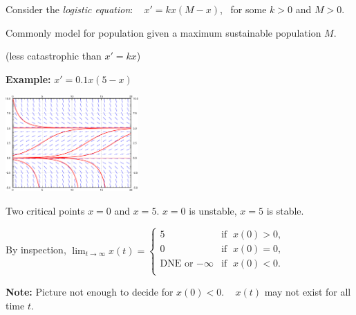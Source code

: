 \documentclass[10pt,aspectratio=169]{beamer}
\begin{document}
\begin{frame}

Consider the \emph{logistic equation}:
~
$x'= kx(M-x)$,~
for some $k > 0$ and $M > 0$.

\medskip
\pause

Commonly model for population given a maximum sustainable population $M$.

(less catastrophic than $x'=kx$)

\medskip
\pause

\textbf{Example:} $x' = 0.1 x(5-x)$

\vspace*{-\baselineskip}

\hspace*{2in} \includegraphics[width=2in]{../figures/2-2-logistic}

\medskip
\pause

Two critical points $x=0$ and $x=5$.
\qquad
\pause
$x=0$ is unstable, \pause $x=5$ is stable.

\medskip
\pause

By inspection, \qquad
$\displaystyle
\lim_{t\to \infty} x(t) = 
\begin{cases}
5 & \text{if } \; x(0) > 0 , \\
0 & \text{if } \; x(0) = 0 , \\
\text{DNE or } {-\infty} & \text{if } \; x(0) < 0 . \\
\end{cases}
$

\medskip
\pause

\textbf{Note:} Picture not enough to decide for $x(0) < 0$.
\pause
~
$x(t)$ may not exist for all time $t$.

\end{frame}
\end{document}
